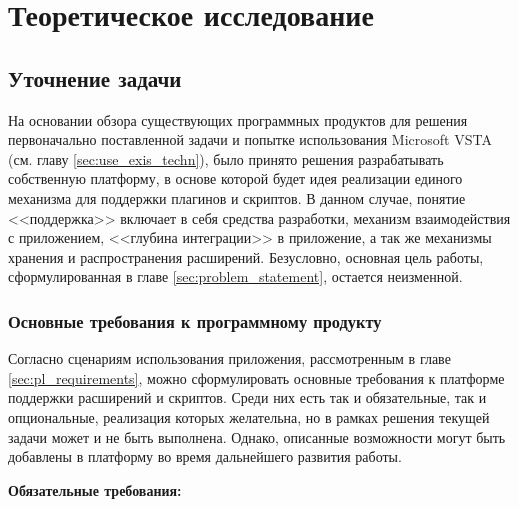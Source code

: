 \section{Теоретическое исследование}





\subsection{Уточнение задачи}

На основании обзора существующих программных продуктов для решения первоначально поставленной задачи и попытке использования Microsoft VSTA (см. главу \ref{sec:use_exis_techn}), было принято решения разрабатывать собственную платформу, в основе которой будет идея реализации единого механизма для поддержки плагинов и скриптов. В данном случае, понятие <<поддержка>> включает в себя средства разработки, механизм взаимодействия с приложением, <<глубина интеграции>> в приложение, а так же механизмы хранения и распространения расширений. Безусловно, основная цель работы, сформулированная в главе \ref{sec:problem_statement}, остается неизменной.

\subsubsection{Основные требования к программному продукту}

Согласно сценариям использования приложения, рассмотренным в главе \ref{sec:pl_requirements}, можно сформулировать основные требования к платформе поддержки расширений и скриптов. Среди них есть так и обязательные, так и опциональные, реализация которых желательна, но в рамках решения текущей задачи может и не быть выполнена. Однако, описанные возможности могут быть добавлены в платформу во время дальнейшего развития работы.

{\bf Обязательные требования:}

